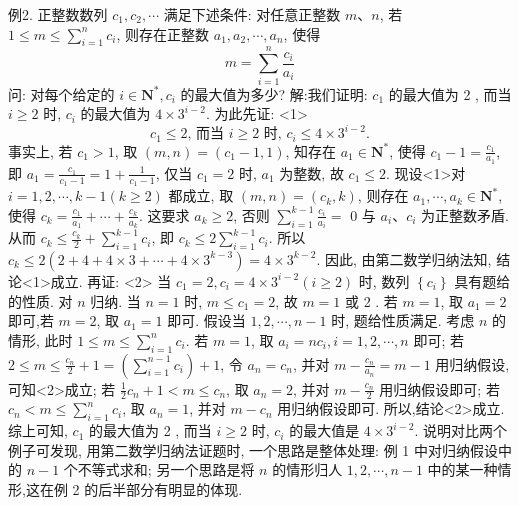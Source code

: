 例2. 正整数数列 $c_1, c_2, \cdots$ 满足下述条件:
对任意正整数 $m 、 n$, 若 $1 \leqslant m \leqslant \sum_{i=1}^n c_i$, 则存在正整数 $a_1, a_2, \cdots, a_n$, 使得
$$
m=\sum_{i=1}^n \frac{c_i}{a_i}
$$
问: 对每个给定的 $i \in \mathbf{N}^*, c_i$ 的最大值为多少?
解:我们证明: $c_1$ 的最大值为 2 , 而当 $i \geqslant 2$ 时, $c_i$ 的最大值为 $4 \times 3^{i-2}$.
为此先证: <1>
$$
c_1 \leqslant 2 \text {, 而当 } i \geqslant 2 \text { 时, } c_i \leqslant 4 \times 3^{i-2} . 
$$
事实上, 若 $c_1>1$, 取 $(m, n)=\left(c_1-1,1\right)$, 知存在 $a_1 \in \mathbf{N}^*$, 使得 $c_1- 1=\frac{c_1}{a_1}$, 即 $a_1=\frac{c_1}{c_1-1}=1+\frac{1}{c_1-1}$, 仅当 $c_1=2$ 时, $a_1$ 为整数, 故 $c_1 \leqslant 2$.
现设<1>对 $i=1,2, \cdots, k-1(k \geqslant 2)$ 都成立, 取 $(m, n)=\left(c_k, k\right)$, 则存在 $a_1, \cdots, a_k \in \mathbf{N}^*$, 使得 $c_k=\frac{c_1}{a_1}+\cdots+\frac{c_k}{a_k}$. 这要求 $a_k \geqslant 2$, 否则 $\sum_{i=1}^{k-1} \frac{c_i}{a_i}=$ 0 与 $a_i 、 c_i$ 为正整数矛盾.
从而 $c_k \leqslant \frac{c_k}{2}+\sum_{i=1}^{k-1} c_i$, 即 $c_k \leqslant 2 \sum_{i=1}^{k-1} c_i$. 所以 $c_k \leqslant 2\left(2+4+4 \times 3+\cdots+4 \times 3^{k-3}\right)=4 \times 3^{k-2}$. 因此, 由第二数学归纳法知, 结论<1>成立.
再证:
<2> 当 $c_1=2, c_i=4 \times 3^{i-2}(i \geqslant 2)$ 时, 数列 $\left\{c_i\right\}$ 具有题给的性质.
对 $n$ 归纳.
当 $n=1$ 时, $m \leqslant c_1=2$, 故 $m=1$ 或 2 . 若 $m=1$, 取 $a_1=2$ 即可,若 $m=2$, 取 $a_1=1$ 即可.
假设当 $1,2, \cdots, n-1$ 时, 题给性质满足.
考虑 $n$ 的情形, 此时 $1 \leqslant m \leqslant \sum_{i=1}^n c_i$.
若 $m=1$, 取 $a_i=n c_i, i=1,2, \cdots, n$ 即可;
若 $2 \leqslant m \leqslant \frac{c_n}{2}+1=\left(\sum_{i=1}^{n-1} c_i\right)+1$, 令 $a_n=c_n$, 并对 $m-\frac{c_n}{a_n}=m-1$ 用归纳假设, 可知<2>成立;
若 $\frac{1}{2} c_n+1<m \leqslant c_n$, 取 $a_n=2$, 并对 $m-\frac{c_n}{2}$ 用归纳假设即可;
若 $c_n<m \leqslant \sum_{i=1}^n c_i$, 取 $a_n=1$, 并对 $m-c_n$ 用归纳假设即可.
所以,结论<2>成立.
综上可知, $c_1$ 的最大值为 2 , 而当 $i \geqslant 2$ 时, $c_i$ 的最大值是 $4 \times 3^{i-2}$.
说明对比两个例子可发现, 用第二数学归纳法证题时, 一个思路是整体处理: 例 1 中对归纳假设中的 $n-1$ 个不等式求和; 另一个思路是将 $n$ 的情形归人 $1,2, \cdots, n-1$ 中的某一种情形,这在例 2 的后半部分有明显的体现.



